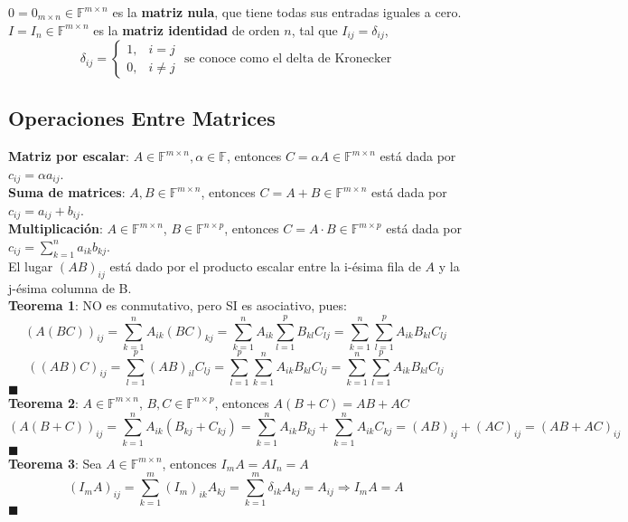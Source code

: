 \documentclass[11pt,a4paper]{article}
\newcommand*{\QEDA}{\null\nobreak\hfill\ensuremath{\blacksquare}}
\begin{document}
$0 = 0_{m \times n} \in \mathbb{F}^{m \times n}$ es la \textbf{matriz nula}, que tiene todas sus entradas iguales a cero.\\
$I = I_n \in \mathbb{F}^{m \times n}$ es la \textbf{matriz identidad} de orden $n$, tal que $I_{ij} = \delta_{ij}$,
$$\delta_{ij} = \left\{ \begin{array}{ll} 1, & i = j \\ 0, & i \not = j \end{array} \right. \text{ se conoce como el delta de Kronecker}$$

\subsection{Operaciones Entre Matrices}
\textbf{Matriz por escalar}: $A \in \mathbb{F}^{m \times n}, \alpha \in \mathbb{F}$, entonces $C = \alpha A \in \mathbb{F}^{m \times n}$ est\'a dada por $c_{ij} = \alpha a_{ij}$.\\
\textbf{Suma de matrices}: $A,B \in \mathbb{F}^{m \times n}$, entonces $C = A + B \in \mathbb{F}^{m \times n}$ est\'a dada por $c_{ij} = a_{ij} + b_{ij}$.\\
\textbf{Multiplicaci\'on}: $A \in \mathbb{F}^{m \times n}$, $B \in \mathbb{F}^{n \times p}$, entonces $C = A \cdot B \in \mathbb{F}^{m \times p}$ est\'a dada por $c_{ij} = \sum_{k=1}^n a_{ik}b_{kj}$. \\ El lugar $(AB)_{ij}$ est\'a dado por el producto escalar entre la i-\'esima fila de $A$ y la j-\'esima columna de B. \\ \textbf{Teorema 1}: NO es conmutativo, pero SI es asociativo, pues: \\$$(A(BC))_{ij} = \sum_{k=1}^n  A_{ik}(BC)_{kj} = \sum_{k=1}^n  A_{ik} \sum_{l=1}^p B_{kl}C_{lj} = \sum_{k=1}^n \sum_{l=1}^p A_{ik}B_{kl}C_{lj}$$
$$((AB)C)_{ij} = \sum_{l=1}^p (AB)_{il}C_{lj} = \sum_{l=1}^p \sum_{k=1}^n A_{ik} B_{kl} C_{lj} = \sum_{k=1}^n \sum_{l=1}^p A_{ik} B_{kl} C_{lj} $$\QEDA\\
\textbf{Teorema 2}: $A \in \mathbb{F}^{m \times n}$, $B,C \in \mathbb{F}^{n \times p}$, entonces $A(B+C) = AB + AC$
$$(A(B+C))_{ij} = \sum_{k=1}^n A_{ik}(B_{kj}+C_{kj}) = \sum_{k=1}^n A_{ik} B_{kj}+ \sum_{k=1}^n A_{ik} C_{kj} = (AB)_{ij} + (AC)_{ij} = (AB + AC)_{ij}$$ \QEDA\\
\textbf{Teorema 3}: Sea $A \in \mathbb{F}^{m \times n}$, entonces $I_mA = AI_n = A$
$$(I_mA)_{ij} = \sum_{k=1}^m (I_m)_{ik}A_{kj} = \sum_{k=1}^m \delta_{ik}A_{kj} = A_{ij} \Rightarrow I_mA = A$$ \QEDA\\
\end{document}
